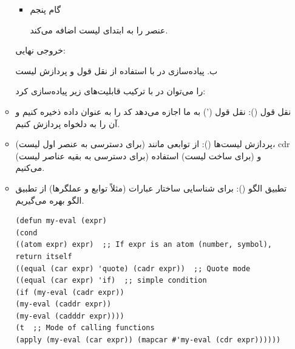 \documentclass[11pt, a4paper, oneside]{article}
\newcounter{itemadded}
\let\LaTeXStandardEnumerateBegin\enumerate
\let\LaTeXStandardEnumerateEnd\endenumerate
\renewenvironment{enumerate}{%
	\LaTeXStandardEnumerateBegin%
	\setcounter{itemadded}{0}
}{%
	\LaTeXStandardEnumerateEnd%
}%
\begin{document}
\begin{itemize}
\begin{itemize}
\begin{enumerate}
\begin{itemize}
							\item {\large گام پنجم} \par
							{\normalsize {} عنصر  را به ابتدای لیست  اضافه می‌کند.} \par
							
							\end{itemize}
							خروجی نهایی: 
							
							
						\end{enumerate}
					
					
					\item[ب.] پیاده‌سازی  در  با استفاده از نقل قول و پردازش لیست
					
					 را می‌توان در  با ترکیب قابلیت‌های زیر پیاده‌سازی کرد:
					
						\begin{enumerate}
							
							\item {\large نقل قول ()}:
							{\normalsize نقل قول (') به ما اجازه می‌دهد کد را به عنوان داده ذخیره کنیم و آن را به دلخواه پردازش کنیم.}
							
							\item {\large پردازش لیست‌ها ()}:
							{\normalsize از توابعی مانند  (برای دسترسی به عنصر اول لیست)، cdr (برای دسترسی به بقیه عناصر لیست) و  (برای ساخت لیست) استفاده می‌کنیم.}
							
							\item {\large تطبیق الگو ()}:
							{\normalsize برای شناسایی ساختار عبارات (مثلاً توابع و عملگرها) از تطبیق الگو بهره می‌گیریم.}
							
						\end{enumerate}
						
						\begin{latin}
							\begin{lstlisting}[caption={\lr{Q2 B - Pseudo code for eval}}]
(defun my-eval (expr)
(cond
((atom expr) expr)  ;; If expr is an atom (number, symbol), return itself
((equal (car expr) 'quote) (cadr expr))  ;; Quote mode
((equal (car expr) 'if)  ;; simple condition
(if (my-eval (cadr expr))
(my-eval (caddr expr))
(my-eval (cadddr expr))))
(t  ;; Mode of calling functions
(apply (my-eval (car expr)) (mapcar #'my-eval (cdr expr))))))

							\end{lstlisting}
						\end{latin}
						

\end{itemize}
\end{itemize}
\end{document}
